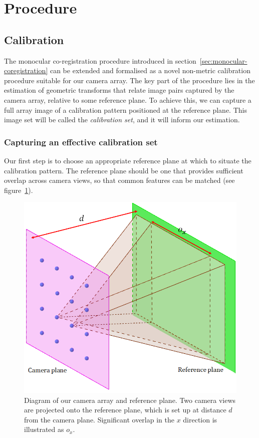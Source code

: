 \documentclass[../main.tex]{subfiles}
\begin{document}
\section{Procedure} \label{sec:procedure}
\subsection{Calibration} \label{sec:calibration-procedure}
The monocular co-registration procedure introduced in section~\ref{sec:monocular-coregistration} can be extended and formalised as a novel non-metric calibration procedure suitable for our camera array. The key part of the procedure lies in the estimation of geometric transforms that relate image pairs captured by the camera array, relative to some reference plane. To achieve this, we can capture a full array image of a calibration pattern positioned at the reference plane. This image set will be called the \emph{calibration set}, and it will inform our estimation. 

\subsubsection{Capturing an effective calibration set}
Our first step is to choose an appropriate reference plane at which to situate the calibration pattern. The reference plane should be one that provides sufficient overlap across camera views, so that common features can be matched (see figure~\ref{fig:overlap}).

\begin{figure}[H]
    \centering
    \includegraphics[width=0.6\linewidth]{images/overlap}
    \caption{Diagram of our camera array and reference plane. Two camera views are projected onto the reference plane, which is set up at distance $d$ from the camera plane. Significant overlap in the $x$ direction is illustrated as $o_x$. }
    \label{fig:overlap}
\end{figure}
\end{document}
